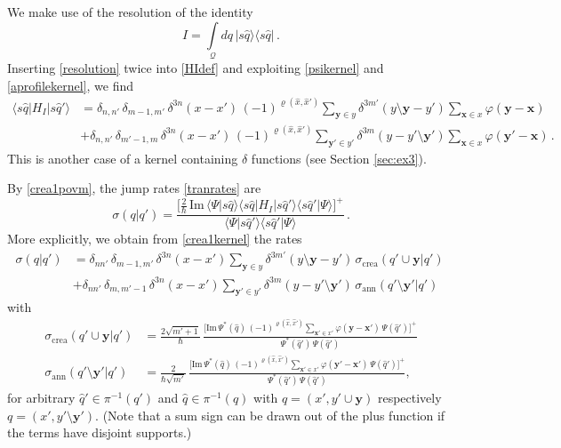 \documentclass[12pt]{article}
\newcommand{\1}{\mathbf{1}} %
\renewcommand{\Im}{\mathrm{Im}} %
\renewcommand{\sp}[2]{\langle #1 | #2 \rangle} %
\newcommand{\conf}{\mathcal{Q}} %
\newcommand{\profile}{\varphi}
\newcommand{\covering}{\pi} %
\newcommand{\permutation}{\varrho} %
\newcommand{\vx}{{\boldsymbol x}} %
\newcommand{\vy}{{\boldsymbol y}}
\newcommand{\inter}{{I}} %
\newcommand{\crea}{{\mathrm{crea}}} %
\newcommand{\ann}{{\mathrm{ann}}} %
\begin{document}
We make use of the resolution of the identity
\begin{equation}\label{resolution}
   I = \int\limits_{\conf} dq \, |s\hat{q} \rangle \langle
   s\hat{q}|\,.
\end{equation}
Inserting \eqref{resolution} twice into \eqref{HIdef} and exploiting
\eqref{psikernel} and \eqref{aprofilekernel}, we find
\begin{equation}\label{crea1kernel}
\begin{split}
   \sp{s\hat{q}} {H_\inter| s\hat{q}'} &= \delta_{n,n'} \,
   \delta_{m-1,m'} \, \delta^{3n}(x-x') \,
   (-1)^{\permutation(\hat{x},\hat{x}')} \sum_{\vy \in y} \delta^{3m'}
   (y \setminus \vy - y') \sum_{\vx \in x} \profile(\vy - \vx) \:  \\
   &+ \delta_{n,n'} \, \delta_{m'-1,m} \,
   \delta^{3n}(x-x') \, (-1)^{\permutation(\hat{x},\hat{x}')}
   \sum_{\vy' \in y'} \delta^{3m} (y - y' \setminus \vy') \sum_{\vx \in
   x} \profile(\vy' - \vx)\,.
\end{split}
\end{equation}
This is another case of a kernel containing $\delta$ functions (see
Section \ref{sec:ex3}).

By \eqref{crea1povm}, the jump rates \eqref{tranrates} are
\begin{equation}
   \sigma(q|q') = \frac{\Big[\tfrac{2}{\hbar} \, \Im \,
   \sp{\Psi}{s\hat{q}} \sp{s\hat{q}}{H_\inter| s\hat{q}'}
\sp{s\hat{q}'}{\Psi}
   \Big]^+} {\sp{\Psi}{s\hat{q}'} \sp{s\hat{q}'}{\Psi}} \,.
\end{equation}
More explicitly, we obtain from \eqref{crea1kernel} the rates
\begin{equation}\label{crea1rates}
\begin{split}
   \sigma(q|q') &= \delta_{nn'} \,\delta_{m-1,m'} \,\delta^{3n}(x-x')
   \sum_{\vy \in y} \delta^{3m'}(y\setminus \vy-y') \,
   \sigma_\crea(q'\cup \vy|q') \:  \\
   &+\delta_{nn'}\,\delta_{m,m'-1} \, \delta^{3n}(x-x') \sum_{\vy' \in
   y'} \delta^{3m}(y - y'\setminus \vy') \, \sigma_\ann(q'\setminus
   \vy'|q')
\end{split}
\end{equation}
with
\begin{subequations}
\begin{align}
   \sigma_\crea(q'\cup \vy|q')&= \frac{2 \sqrt{m'+1}}{\hbar} \,
   \frac{\Big[ \Im \, \Psi^*(\hat{q}) \,
   (-1)^{\permutation(\hat{x},\hat{x}')} \sum\limits_{\vx' \in x'}
   \varphi(\vy-\vx') \, \Psi(\hat{q}')\Big]^+}{ \Psi^*(\hat{q}') \,
   \Psi(\hat{q}')} \label{crea1crearate} \\
   \sigma_\ann(q'\setminus \vy'|q')&= \frac{2} {\hbar \sqrt{m'}}
   \,\frac{\Big[\Im \, \Psi^*(\hat{q}) \,
   (-1)^{\permutation(\hat{x},\hat{x}')} \sum\limits_{\vx' \in x'}
   \varphi(\vy'-\vx') \, \Psi(\hat{q}') \Big]^+}{ \Psi^*(\hat{q}') \,
   \Psi(\hat{q}')} , \label{crea1annrate}
\end{align}
\end{subequations}
for arbitrary $\hat{q}' \in \covering^{-1}(q')$ and $\hat{q} \in
\covering^{-1}(q)$ with $q=(x',y'\cup\vy)$ respectively $q=(x',y'
\setminus \vy')$.  (Note that a sum sign can be drawn out of the plus
function if the terms have disjoint supports.)
\end{document}
